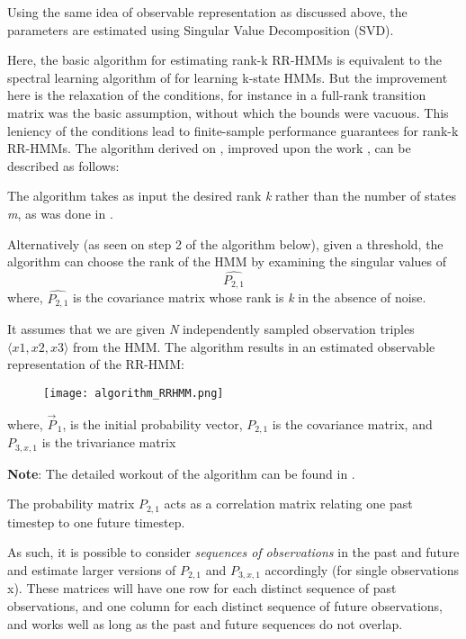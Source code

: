 Using the same idea of observable representation as discussed above, the parameters are estimated using Singular Value Decomposition (SVD).


Here, the basic algorithm for estimating rank-k RR-HMMs is
equivalent to the spectral learning algorithm of \cite{ref2} for learning k-state HMMs. But the improvement here is the relaxation of the conditions, for instance in \cite{ref2} a full-rank transition matrix was the basic assumption, without which the bounds were vacuous. This leniency of the conditions lead to finite-sample performance guarantees for rank-k RR-HMMs.
\newline
\newline
The algorithm derived on \cite{ref7}, improved upon the work \cite{ref2}, can be described as follows:

The algorithm takes as input the desired rank \textit{k}
rather than the number of states \textit{m}, as was done in \cite{ref2}.

Alternatively (as seen on step 2 of the algorithm below), given a threshold, the algorithm can choose the rank of the HMM by examining the singular values of \[\widehat{{P}_{2,1}}\]
 \quad where, $ \widehat{{P}_{2,1}} $ is the covariance matrix whose rank is \textit{k} in the absence of noise. 

It assumes that we are given \textit{N} independently sampled
observation triples $\langle x1, x2, x3\rangle$ from the HMM. 
The algorithm results in an estimated observable representation of the RR-HMM:
\newline
\begin{figure}[h]
    \centering
    \texttt{[image: algorithm\_RRHMM.png]}        
\end{figure}

where, ${\vec{P}_{\,1}}$, is the initial probability vector,
$ {P}_{2,1} $ is the covariance matrix, and
$ {P}_{3,x,1} $ is the trivariance matrix

\textbf{Note}: The detailed workout of the algorithm can be found in \cite{ref7}.


The probability matrix $ {P}_{2,1} $  acts as a correlation matrix relating one past timestep to one future timestep.

As such, it is possible to consider \textit{sequences of
observations} in the past and future and estimate larger
versions of $ {P}_{2,1} $  and $ {P}_{3,x,1} $  accordingly (for single observations
x). These matrices will have one row for each
distinct sequence of past observations, and one column
for each distinct sequence of future observations, and works well as long as the past and future sequences do not overlap.


